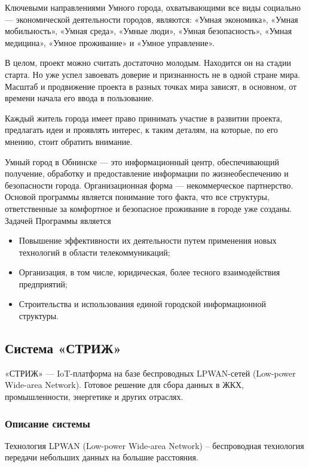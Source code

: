 Ключевыми направлениями Умного города, охватывающими все виды социально --- экономической деятельности городов, являются: «Умная экономика», «Умная мобильность», «Умная среда», «Умные люди», «Умная безопасность», «Умная медицина», «Умное проживание» и «Умное управление». 

В целом, проект можно считать достаточно молодым. Находится он на стадии старта. Но уже успел завоевать доверие и признанность не в одной стране мира. Масштаб и продвижение проекта в разных точках мира зависят, в основном, от времени начала его ввода в пользование. 

Каждый житель города имеет право принимать участие в развитии проекта, предлагать идеи и проявлять интерес, к таким деталям, на которые, по его мнению, стоит обратить внимание. 

Умный город в Обнинске --- это информационный центр, обеспечивающий получение, обработку и предоставление информации по жизнеобеспечению и безопасности города. Организационная форма --- некоммерческое партнерство. Основой программы является понимание того факта, что все структуры, ответственные за комфортное и безопасное проживание в городе уже созданы. Задачей Программы является 
\begin{itemize}
	\item Повышение эффективности их деятельности путем применения новых технологий в области телекоммуникаций; 	
	\item Организация, в том числе, юридическая, более тесного взаимодействия предприятий; 
	\item Строительства и использования единой городской информационной структуры.
\end{itemize}

\subsection{Система «СТРИЖ»}
«СТРИЖ» — IoT-платформа на базе беспроводных LPWAN-сетей (Low-power Wide-area Network). Готовое решение для сбора данных в ЖКХ, промышленности, энергетике и других отраслях. \cite{strij}
\subsubsection{Описание системы}
Технология LPWAN (Low-power Wide-area Network) – беспроводная технология передачи небольших данных на большие расстояния. 

